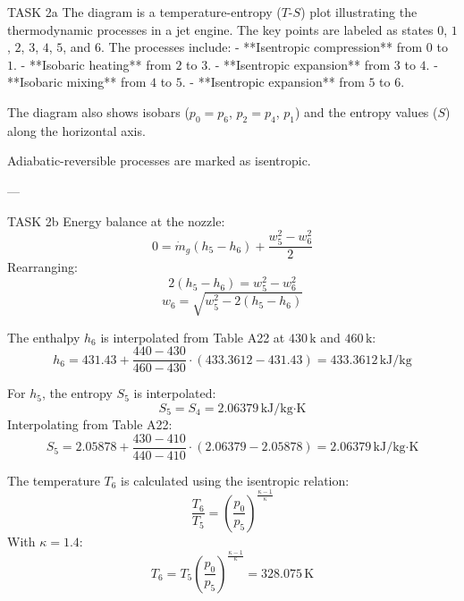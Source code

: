 TASK 2a  
The diagram is a temperature-entropy (\( T \)-\( S \)) plot illustrating the thermodynamic processes in a jet engine. The key points are labeled as states \( 0 \), \( 1 \), \( 2 \), \( 3 \), \( 4 \), \( 5 \), and \( 6 \). The processes include:  
- **Isentropic compression** from \( 0 \) to \( 1 \).  
- **Isobaric heating** from \( 2 \) to \( 3 \).  
- **Isentropic expansion** from \( 3 \) to \( 4 \).  
- **Isobaric mixing** from \( 4 \) to \( 5 \).  
- **Isentropic expansion** from \( 5 \) to \( 6 \).  

The diagram also shows isobars (\( p_0 = p_6 \), \( p_2 = p_4 \), \( p_1 \)) and the entropy values (\( S \)) along the horizontal axis.  

Adiabatic-reversible processes are marked as isentropic.  

---

TASK 2b  
Energy balance at the nozzle:  
\[
0 = \dot{m}_g (h_5 - h_6) + \frac{w_5^2 - w_6^2}{2}
\]  
Rearranging:  
\[
2(h_5 - h_6) = w_5^2 - w_6^2
\]  
\[
w_6 = \sqrt{w_5^2 - 2(h_5 - h_6)}
\]  

The enthalpy \( h_6 \) is interpolated from Table A22 at \( 430 \, \text{k} \) and \( 460 \, \text{k} \):  
\[
h_6 = 431.43 + \frac{440 - 430}{460 - 430} \cdot (433.3612 - 431.43) = 433.3612 \, \text{kJ/kg}
\]  

For \( h_5 \), the entropy \( S_5 \) is interpolated:  
\[
S_5 = S_4 = 2.06379 \, \text{kJ/kg·K}
\]  
Interpolating from Table A22:  
\[
S_5 = 2.05878 + \frac{430 - 410}{440 - 410} \cdot (2.06379 - 2.05878) = 2.06379 \, \text{kJ/kg·K}
\]  

The temperature \( T_6 \) is calculated using the isentropic relation:  
\[
\frac{T_6}{T_5} = \left( \frac{p_0}{p_5} \right)^{\frac{\kappa - 1}{\kappa}}
\]  
With \( \kappa = 1.4 \):  
\[
T_6 = T_5 \left( \frac{p_0}{p_5} \right)^{\frac{\kappa - 1}{\kappa}} = 328.075 \, \text{K}
\]